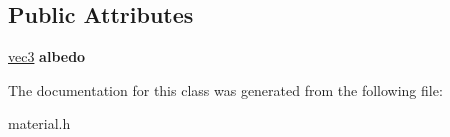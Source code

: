 \subsection*{Public Attributes}
\begin{DoxyCompactItemize}
\item 
\mbox{\label{classlambertian_a81dc7cd414273c1bec5409e6bfe18f95}} 
\hyperlink{classvec3}{vec3} {\bfseries albedo}
\end{DoxyCompactItemize}


The documentation for this class was generated from the following file\+:\begin{DoxyCompactItemize}
\item 
material.\+h\end{DoxyCompactItemize}
